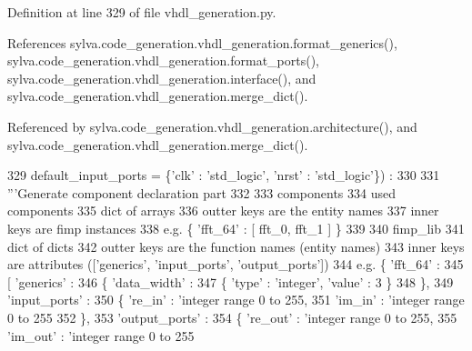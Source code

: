 Definition at line 329 of file vhdl\+\_\+generation.\+py.



References sylva.\+code\+\_\+generation.\+vhdl\+\_\+generation.\+format\+\_\+generics(), sylva.\+code\+\_\+generation.\+vhdl\+\_\+generation.\+format\+\_\+ports(), sylva.\+code\+\_\+generation.\+vhdl\+\_\+generation.\+interface(), and sylva.\+code\+\_\+generation.\+vhdl\+\_\+generation.\+merge\+\_\+dict().



Referenced by sylva.\+code\+\_\+generation.\+vhdl\+\_\+generation.\+architecture(), and sylva.\+code\+\_\+generation.\+vhdl\+\_\+generation.\+merge\+\_\+dict().


\begin{DoxyCode}
329   default\_input\_ports = \{\textcolor{stringliteral}{'clk'} : \textcolor{stringliteral}{'std\_logic'}, \textcolor{stringliteral}{'nrst'} : \textcolor{stringliteral}{'std\_logic'}\}) :
330 
331   \textcolor{stringliteral}{'''Generate component declaration part}
332 \textcolor{stringliteral}{}
333 \textcolor{stringliteral}{    components}
334 \textcolor{stringliteral}{      used components}
335 \textcolor{stringliteral}{      dict of arrays}
336 \textcolor{stringliteral}{      outter keys are the entity names}
337 \textcolor{stringliteral}{      inner keys are fimp instances}
338 \textcolor{stringliteral}{      e.g. \{ 'fft\_64' : [ fft\_0, fft\_1 ] \}}
339 \textcolor{stringliteral}{}
340 \textcolor{stringliteral}{    fimp\_lib}
341 \textcolor{stringliteral}{      dict of dicts}
342 \textcolor{stringliteral}{      outter keys are the function names (entity names)}
343 \textcolor{stringliteral}{      inner keys are attributes (['generics', 'input\_ports', 'output\_ports'])}
344 \textcolor{stringliteral}{      e.g. \{ 'fft\_64' :}
345 \textcolor{stringliteral}{             [ 'generics' :}
346 \textcolor{stringliteral}{               \{ 'data\_width' :}
347 \textcolor{stringliteral}{                 \{ 'type' : 'integer', 'value' : 3 \}}
348 \textcolor{stringliteral}{               \},}
349 \textcolor{stringliteral}{               'input\_ports' :}
350 \textcolor{stringliteral}{               \{ 're\_in' : 'integer range 0 to 255,}
351 \textcolor{stringliteral}{                 'im\_in' : 'integer range 0 to 255}
352 \textcolor{stringliteral}{               \},}
353 \textcolor{stringliteral}{               'output\_ports' :}
354 \textcolor{stringliteral}{               \{ 're\_out' : 'integer range 0 to 255,}
355 \textcolor{stringliteral}{                 'im\_out' : 'integer range 0 to 255}

\end{DoxyCode}
